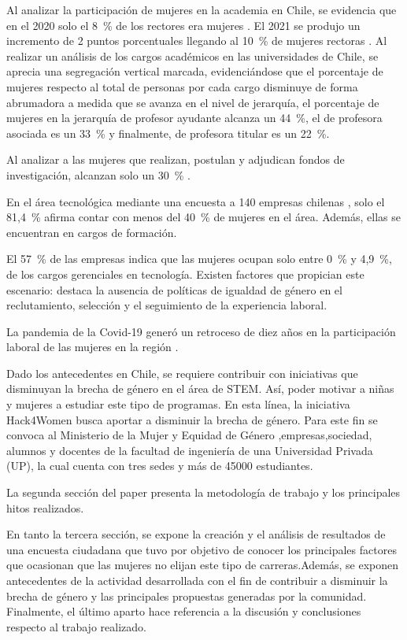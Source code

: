 \documentclass[spanish]{textolivre}
\begin{document}
Al analizar la participación de mujeres en la academia en Chile, se evidencia que en el 2020 solo el 8~\% de los rectores era mujeres \cite{Futuro2020}. El 2021 se produjo un incremento de 2 puntos porcentuales llegando al 10~\% de mujeres rectoras \cite{Rectores2022}. 
Al realizar un análisis de los cargos académicos en las universidades de Chile, se aprecia una segregación vertical marcada, evidenciándose que el porcentaje de mujeres respecto al total de personas por cada cargo disminuye de forma abrumadora a medida que se avanza en el nivel de jerarquía, el porcentaje de mujeres en la jerarquía de profesor ayudante alcanza un 44~\%, el de profesora asociada es un 33~\%  y finalmente, de profesora titular es un 22~\%.

Al analizar a las mujeres que realizan, postulan y adjudican fondos de investigación, alcanzan solo un 30~\% \cite{Futuro2020}.

En el área tecnológica mediante una encuesta a 140 empresas chilenas \cite{Mujeres2021}, solo el 81,4~\% afirma contar con menos del 40~\% de mujeres en el área. Además, ellas se encuentran en cargos de formación.

El 57~\% de las empresas indica que las mujeres ocupan solo entre 0~\% y 4,9~\%, de los cargos gerenciales en tecnología. Existen factores que propician este escenario: destaca la ausencia de políticas de igualdad de género en el reclutamiento, selección y el seguimiento de la experiencia laboral.

La pandemia de la Covid-19 generó un retroceso de diez años en la participación laboral de las mujeres en la región \cite{CEPAL2022}.

Dado los antecedentes en Chile, se requiere contribuir con iniciativas que disminuyan la brecha de género en el área de STEM. Así, poder motivar a niñas y mujeres a estudiar este tipo de programas. En esta línea, la iniciativa Hack4Women busca aportar a disminuir la brecha de género. Para este fin se convoca al Ministerio de la Mujer y Equidad de Género \cite{MinisteriodelaMujer2022},empresas,sociedad, alumnos y docentes de la facultad de ingeniería de una Universidad Privada (UP), la cual cuenta con tres sedes y más de 45000 estudiantes.

La segunda sección del paper presenta la metodología de trabajo y los principales hitos realizados.

En tanto la tercera sección, se expone la creación y el análisis de resultados de una encuesta ciudadana que tuvo por objetivo de conocer los principales factores que ocasionan que las mujeres no elijan este tipo de carreras.Además, se exponen antecedentes de la actividad desarrollada con el fin de contribuir a disminuir la brecha de género y las principales propuestas generadas por la comunidad.
Finalmente, el último aparto hace referencia a la discusión y conclusiones respecto  al trabajo realizado.
\end{document}
